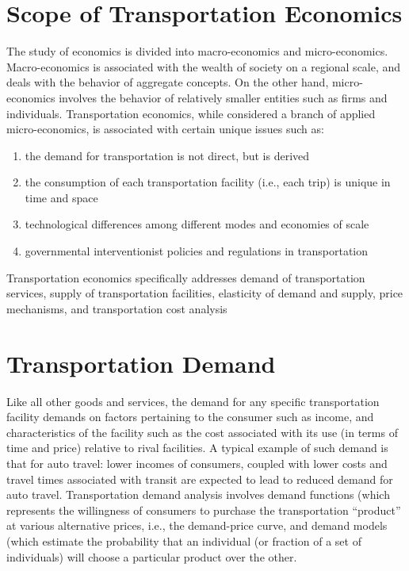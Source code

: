 \section{Scope of Transportation Economics}
The study of economics is divided into macro-economics and micro-economics. Macro-economics is associated with the wealth of society on a regional scale, and deals with the behavior of aggregate concepts. On the other hand, micro-economics involves the behavior of relatively smaller entities such as firms and individuals. Transportation economics, while considered a branch of applied micro-economics, is associated with certain unique issues such as:
\begin{enumerate}
	\item the demand for transportation is not direct, but is derived
	\item the consumption of each transportation facility (i.e., each trip) is unique in time and space
	\item technological differences among different modes and economies of scale
	\item governmental interventionist policies and regulations in transportation
\end{enumerate}
Transportation economics specifically addresses demand of transportation services, supply of transportation facilities, elasticity of demand and supply, price mechanisms, and transportation cost analysis
%
\section{Transportation Demand}
Like all other goods and services, the demand for any specific transportation facility demands on factors pertaining to the consumer such as income, and characteristics of the facility such as the cost associated with its use (in terms of time and price) relative to rival facilities. A typical example of such demand is that for auto travel: lower incomes of consumers, coupled with lower costs and travel times associated with transit are expected to lead to reduced demand for auto travel. Transportation demand analysis involves demand functions (which represents the willingness of consumers to purchase the transportation “product” at various alternative prices, i.e., the demand-price curve, and demand models (which estimate the probability that an individual (or fraction of a set of individuals) will choose a particular product over the other.
